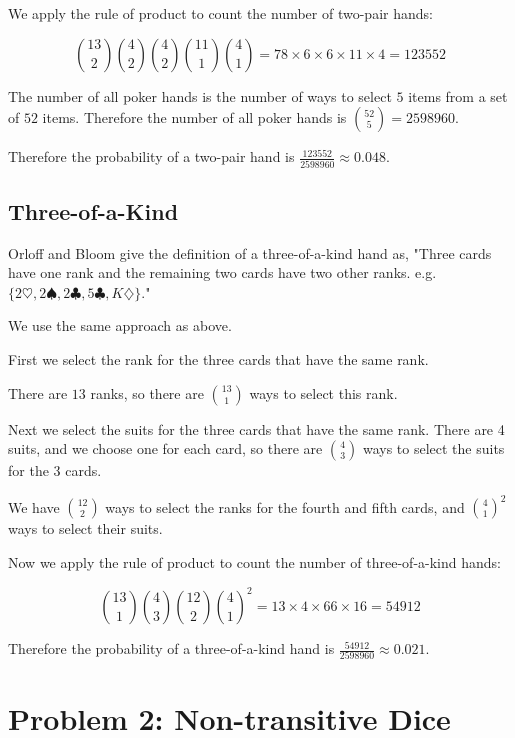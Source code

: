 \documentclass[a4paper,11pt]{article}
\begin{document}
We apply the rule of product to count the number of two-pair hands:

\begin{equation}
\binom{13}{2} \binom{4}{2} \binom{4}{2} 
\binom{11}{1} \binom{4}{1} = 78 \times 6 \times 6 \times 11 \times 4 = 
123552
\end{equation}

The number of all poker hands is the number of ways to select $5$ items
from a set of $52$ items.  Therefore the number of all poker hands is
$\binom{52}{5} = 2598960$.

Therefore the probability of a two-pair hand is $\frac{123552}{2598960}
\approx 0.048$.

\subsection{Three-of-a-Kind}
Orloff and Bloom give the definition of a three-of-a-kind hand as,
"Three cards have one rank and the remaining two cards
have two other ranks. e.g. $\{2\heartsuit, 2\spadesuit, 2\clubsuit,
5\clubsuit, K\diamondsuit\}$." \cite{probSet1}

We use the same approach as above.

First we select the rank for the three cards that have the same rank.

There are $13$ ranks, so there are $\binom{13}{1}$ ways to select this
rank.

Next we select the suits for the three cards that have the same rank.
There are 4 suits, and we choose one for each card, so there are
$\binom{4}{3}$ ways to select the suits for the 3 cards.

We have $\binom{12}{2}$ ways to select the ranks for the fourth 
and fifth cards, and $\binom{4}{1}^{2}$ ways to select their suits.

Now we apply the rule of product to count the number of 
three-of-a-kind hands:

\begin{equation}
\binom{13}{1} \binom{4}{3} \binom{12}{2} \binom{4}{1}^{2} =
13 \times 4 \times 66 \times 16 = 54912
\end{equation}

Therefore the probability of a three-of-a-kind hand is 
$\frac{54912}{2598960} \approx 0.021$.

\section{Problem 2: Non-transitive Dice}
\end{document}
